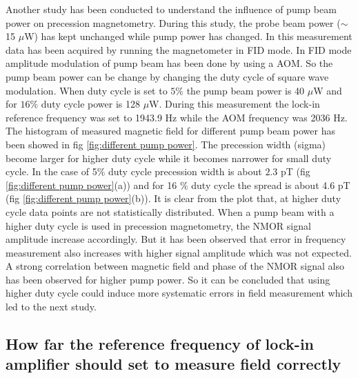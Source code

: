 Another study has been conducted to understand the influence of pump beam power on precession magnetometry. During this study, the probe beam power ($\sim$ 15 $ \mu$W) has kept unchanged while pump power has changed. In this measurement data has been acquired by running the magnetometer in FID mode. In FID mode amplitude modulation of pump beam has been done by using a AOM.  So the pump beam power can be change by changing the duty cycle of square wave modulation. When duty cycle is set to $5\%$ the pump beam power is 40 $\mu$W and for $16 \%$ duty cycle power is 128 $\mu$W. During this measurement the lock-in reference frequency was set to 1943.9 Hz while the AOM frequency was 2036 Hz. The histogram of measured magnetic field for different pump beam power has been showed in fig \ref{fig:different pump power}. The precession width (sigma) become larger for higher duty cycle while it becomes narrower for small duty cycle. In the case of 5$\%$  duty cycle precession width is about $2.3$ pT  (fig \ref{fig:different pump power}(a)) and for 16 $\%$ duty cycle the spread is about 4.6 pT (fig \ref{fig:different pump power}(b)). It is clear from the plot that, at higher duty cycle data points are not statistically distributed.  When a pump beam with a higher duty cycle is used  in precession magnetometry, the NMOR  signal amplitude increase accordingly. But it has been observed that error in frequency measurement also increases with higher signal amplitude which was not expected. A strong correlation between magnetic field and phase of the NMOR signal also has been observed for higher pump power. So it can be concluded that using higher duty cycle could induce more systematic errors in field measurement which led to the next study.


\subsection{How far the reference frequency of lock-in amplifier should set to measure field correctly}
  
